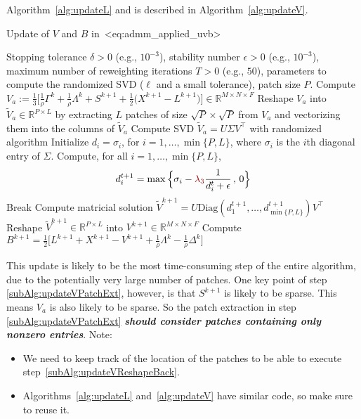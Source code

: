 \documentclass[a4paper,11pt]{article}
\def\eqref#1{<#1>}%
\begin{document}
Algorithm~\ref{alg:updateL} and is described in Algorithm~\ref{alg:updateV}.
\begin{algorithm}
  \caption{Update of $V$ and $B$ in~\eqref{eq:admm_applied_uvb}}
  \label{alg:updateV}
  \begin{algorithmic}[1]
  \algrenewcommand{}
  \Require Stopping tolerance $\delta > 0$ (e.g., $10^{-3}$), stability number $\epsilon > 0$ (e.g., $10^{-3}$), maximum number of
  reweighting iterations $T > 0$ (e.g., $50$), parameters to compute the
  randomized SVD ($\ell$ and a small tolerance), patch size $P$.
  \State Compute $V_a := \frac{1}{3}\Big[\frac{1}{\rho}\Gamma^k + \frac{1}{\rho}\Lambda^k + S^{k+1}
  + \frac{1}{2}\big(X^{k+1} - L^{k+1}\big)\Big] \in \mathbb{R}^{M\times N\times F}$
  \State Reshape $V_a$ into $\widetilde{V}_a \in \mathbb{R}^{P \times L}$ by
  extracting $L$ patches of size $\sqrt{P} \times \sqrt{P}$ from $V_a$ and vectorizing
  them into the columns of $\widetilde{V}_a$
  \label{subAlg:updateVPatchExt}
  \State Compute SVD $\widetilde{V}_a = U \Sigma V^\top$ with randomized
  algorithm
  \State Initialize $d_i = \sigma_i$, for $i = 1, \ldots, \min\{P, L\}$, where
  $\sigma_i$ is the $i$th diagonal entry of $\Sigma$.
    \State Compute, for all $i = 1, \ldots, \min\{P, L\}$, 
    $$
    d_i^{t+1} = \max\Big\{\sigma_i - \textcolor{red}{\lambda_3}\frac{1}{d_i^t + \epsilon}\, ,\, 0\Big\}
    $$
      \State Break
    \EndIf
  \EndFor
  \State Compute matricial solution $\widetilde{V}^{k+1} = U
  \text{Diag}(d_1^{t+1}, \ldots, d_{\min\{P, L\}}^{t+1}) V^\top$
  \State Reshape $\widetilde{V}^{k+1} \in \mathbb{R}^{P \times L}$ into
  $V^{k+1} \in \mathbb{R}^{M\times N\times F}$
  \label{subAlg:updateVReshapeBack}
  \State Compute 
  $B^{k+1} = \frac{1}{2}\Big[L^{k+1} + X^{k+1} - V^{k+1} +\frac{1}{\rho}\Lambda^k - \frac{1}{\rho}\Delta^k\Big]$
  \end{algorithmic}
\end{algorithm}

This update is likely to be the most time-consuming step of the entire
algorithm, due to the potentially very large number of patches. One key point
of step \ref{subAlg:updateVPatchExt},
however, is that $S^{k+1}$ is likely to be sparse. This means $V_a$ is also
likely to be sparse. So the patch extraction in step
\ref{subAlg:updateVPatchExt} \textbf{\textit{should consider patches containing only nonzero
entries}}. Note:
\begin{itemize}
  \item We need to keep track of the location of the patches to be able to
    execute step~\ref{subAlg:updateVReshapeBack}.

  \item Algorithms~\ref{alg:updateL} and~\ref{alg:updateV} have similar code,
    so make sure to reuse it.
\end{itemize}
\end{document}
